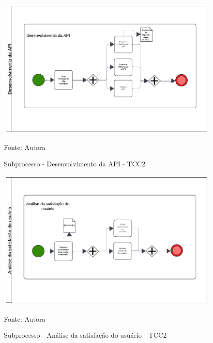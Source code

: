 \begin{figure}[htbp]
    \centering
    \caption{Subprocesso - Desenvolvimento da API - TCC2}
    \label{fig:subproccessapi}
    
    \vspace{2pt} %
    
    \includegraphics[width=1.0\textwidth]{figuras/subproccessapi.eps}
    
    \vspace{2pt} %
    
    \small Fonte: Autora
\end{figure}

\begin{figure}[htbp]
    \centering
    \caption{Subprocesso - Análise da satisfação do usuário - TCC2}
    \label{fig:subproccessana}
    
    \vspace{2pt} %
    
    \includegraphics[width=1.0\textwidth]{figuras/subproccessana.eps}
    
    \vspace{2pt} %
    
    \small Fonte: Autora
\end{figure}

